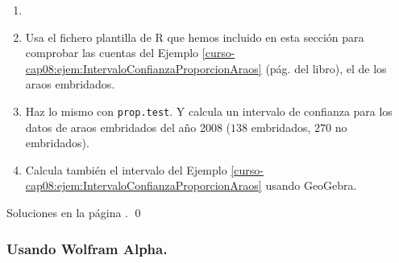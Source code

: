 \documentclass[10pt,a4paper]{article}\usepackage[]{graphicx}\usepackage[]{color}
\begin{document}
\begin{ejercicio}
\label{tut08:ejercicio01}

\begin{enumerate}
    \item[]
    \item Usa el fichero plantilla de R que hemos incluido en esta sección para comprobar las cuentas del Ejemplo \ref{curso-cap08:ejem:IntervaloConfianzaProporcionAraos} (pág. \pageref{curso-cap08:ejem:IntervaloConfianzaProporcionAraos} del libro), el de los araos embridados.

    \item Haz lo mismo con {\tt prop.test}. Y calcula un intervalo de confianza para los datos de araos embridados del año 2008 ($138$ embridados, $270$ no embridados).

    \item Calcula también el intervalo del Ejemplo \ref{curso-cap08:ejem:IntervaloConfianzaProporcionAraos} usando GeoGebra.
\end{enumerate}
Soluciones en la página \pageref{tut08:ejercicio01:sol}.
\qed
\end{ejercicio}

\subsubsection*{Usando Wolfram Alpha.}
\end{document}
